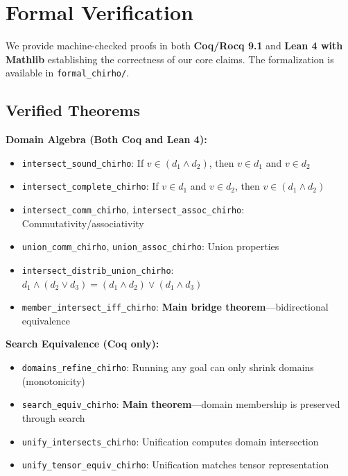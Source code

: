 \documentclass[11pt,a4paper]{article}
\begin{document}
\section{Formal Verification}

We provide machine-checked proofs in both \textbf{Coq/Rocq 9.1} and \textbf{Lean 4 with Mathlib} establishing the correctness of our core claims.
The formalization is available in \texttt{formal\_chirho/}.

\subsection{Verified Theorems}

\textbf{Domain Algebra (Both Coq and Lean 4):}
\begin{itemize}
  \item \texttt{intersect\_sound\_chirho}: If $v \in (d_1 \land d_2)$, then $v \in d_1$ and $v \in d_2$
  \item \texttt{intersect\_complete\_chirho}: If $v \in d_1$ and $v \in d_2$, then $v \in (d_1 \land d_2)$
  \item \texttt{intersect\_comm\_chirho}, \texttt{intersect\_assoc\_chirho}: Commutativity/associativity
  \item \texttt{union\_comm\_chirho}, \texttt{union\_assoc\_chirho}: Union properties
  \item \texttt{intersect\_distrib\_union\_chirho}: $d_1 \land (d_2 \lor d_3) = (d_1 \land d_2) \lor (d_1 \land d_3)$
  \item \texttt{member\_intersect\_iff\_chirho}: \textbf{Main bridge theorem}---bidirectional equivalence
\end{itemize}

\textbf{Search Equivalence (Coq only):}
\begin{itemize}
  \item \texttt{domains\_refine\_chirho}: Running any goal can only shrink domains (monotonicity)
  \item \texttt{search\_equiv\_chirho}: \textbf{Main theorem}---domain membership is preserved through search
  \item \texttt{unify\_intersects\_chirho}: Unification computes domain intersection
  \item \texttt{unify\_tensor\_equiv\_chirho}: Unification matches tensor representation
\end{itemize}
\end{document}
